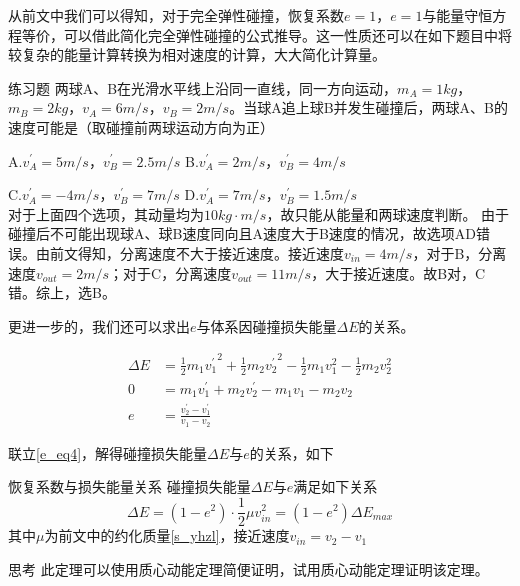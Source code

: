 从前文中我们可以得知，对于完全弹性碰撞，恢复系数$e=1$，$e=1$与能量守恒方程等价，可以借此简化完全弹性碰撞的公式推导。这一性质还可以在如下题目中将较复杂的能量计算转换为相对速度的计算，大大简化计算量。

\begin{ep}{练习题}{}
两球A、B在光滑水平线上沿同一直线，同一方向运动，$m_A = 1kg$，$m_B = 2kg$，$v_A = 6m/s$，$v_B = 2m/s$。当球A追上球B并发生碰撞后，两球A、B的速度可能是（取碰撞前两球运动方向为正）

A.$v_A^{\prime} = 5m/s$，$v_B^{\prime} = 2.5m/s$ \quad B.$v_A^{\prime} = 2m/s$，$v_B^{\prime} = 4m/s$

C.$v_A^{\prime} = -4m/s$，$v_B^{\prime} = 7m/s$ \quad D.$v_A^{\prime} = 7m/s$，$v_B^{\prime} = 1.5m/s$
~\\

对于上面四个选项，其动量均为$10kg \cdot m/s$，故只能从能量和两球速度判断。
由于碰撞后不可能出现球A、球B速度同向且A速度大于B速度的情况，故选项AD错误。由前文得知，分离速度不大于接近速度。接近速度$v_{in}=4m/s$，对于B，分离速度$v_{out} = 2m/s$；对于C，分离速度$v_{out} = 11m/s$，大于接近速度。故B对，C错。综上，选B。
\end{ep}

更进一步的，我们还可以求出$e$与体系因碰撞损失能量$\Delta E$的关系。

\begin{subequations}
\label{e_eq4}
\begin{align}
\Delta E &= \frac{1}{2} m_1 {v_1^{\prime}}^2 + \frac{1}{2} m_2 {v_2^{\prime}}^2 - \frac{1}{2} m_1 v_1^2 - \frac{1}{2} m_2 v_2^2 \\
0 &= m_1 v_1^{\prime} + m_2 v_2^{\prime} - m_1 v_1 - m_2 v_2 \\
e &= \frac{v_2^{\prime} - v_1^{\prime}}{v_1 - v_2}
\end{align}
\end{subequations}

联立\eqref{e_eq4}，解得碰撞损失能量$\Delta E$与$e$的关系，如下

\begin{theo}{恢复系数与损失能量关系}{}
碰撞损失能量$\Delta E$与$e$满足如下关系
$$\Delta E = (1 - e^2) \cdot \frac{1}{2} \mu v_{in}^2 = (1 - e^2) \Delta E_{max}$$
其中$\mu$为前文中的约化质量\eqref{s_yhzl}，接近速度$v_{in} = v_2 - v_1$
\end{theo}

\begin{mk}{思考}{}
此定理可以使用质心动能定理简便证明，试用质心动能定理证明该定理。
\end{mk}

